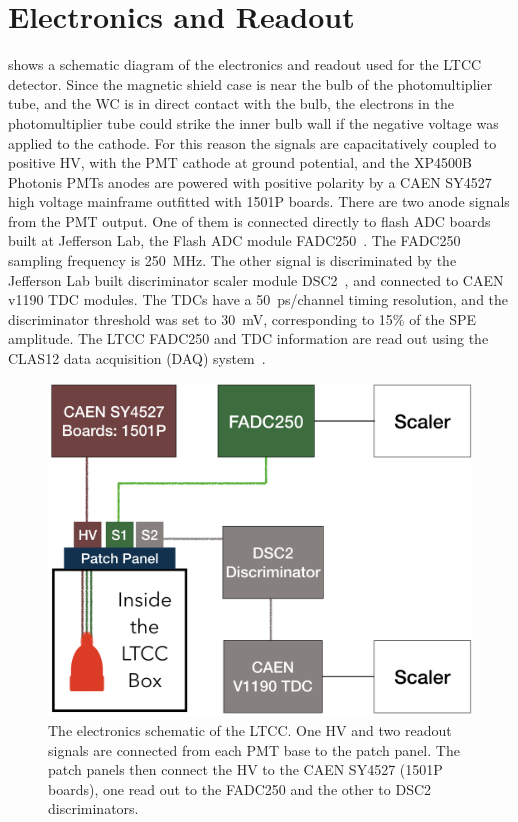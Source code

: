 \section{Electronics and Readout}

 shows a schematic diagram of the electronics and readout used for the LTCC
detector. Since the magnetic shield case is near the bulb of the photomultiplier tube, and the WC is in direct contact
with the bulb, the electrons in the photomultiplier tube could strike the inner bulb wall if the negative voltage
was applied to the cathode. For this reason the signals are capacitatively coupled to positive HV, with the PMT
cathode at ground potential,
and the XP4500B Photonis PMTs anodes are powered with positive polarity by a CAEN SY4527 high voltage
mainframe outfitted with 1501P boards. There are two anode signals from the PMT output. One of them is
connected directly to flash ADC boards built at Jefferson Lab, the Flash ADC module FADC250~\cite{daq-nim}.
The FADC250 sampling frequency is 250~MHz. The other signal is discriminated by the Jefferson Lab built
discriminator scaler module DSC2~\cite{daq-nim}, and connected to CAEN v1190 TDC modules. The TDCs have a
50~ps/channel timing resolution, and the discriminator threshold was set to 30~mV, corresponding to 15\% of the
SPE amplitude. The LTCC FADC250 and TDC information are read out using the CLAS12 data acquisition (DAQ)
system~\cite{daq-nim}.

\begin{figure}
	\centering
	\includegraphics[width=0.99\columnwidth, height=0.6\columnwidth]{img/electronicScheme.png}
	\caption{The electronics schematic of the LTCC. One HV and two readout signals are connected from each PMT
          base to the patch panel. The patch panels then connect the HV to the CAEN SY4527 (1501P boards), one read
          out to the FADC250 and the other to DSC2 discriminators.}
	\label{fig:electronicScheme}
\end{figure}

